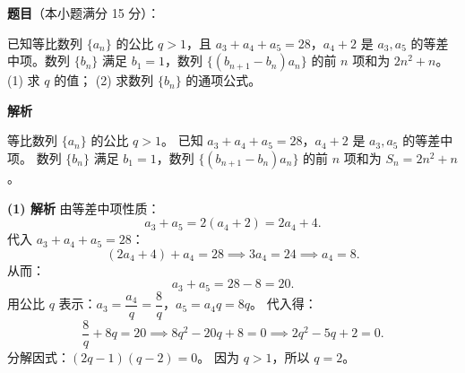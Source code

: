 \begin{answer}

\textbf{题目}（本小题满分 15 分）：

已知等比数列 $\{a_n\}$ 的公比 $q > 1$，且 $a_3 + a_4 + a_5 = 28$，$a_4 + 2$ 是 $a_3, a_5$ 的等差中项。数列 $\{b_n\}$ 满足 $b_1 = 1$，数列 $\{(b_{n+1} - b_n)a_n\}$ 的前 $n$ 项和为 $2n^2 + n$。
(1) 求 $q$ 的值；
(2) 求数列 $\{b_n\}$ 的通项公式。

\textbf{解析}

等比数列 $\{a_n\}$ 的公比 $q > 1$。
已知 $a_3 + a_4 + a_5 = 28$，$a_4 + 2$ 是 $a_3, a_5$ 的等差中项。
数列 $\{b_n\}$ 满足 $b_1 = 1$，数列 $\{(b_{n+1} - b_n)a_n\}$ 的前 $n$ 项和为 $S_n = 2n^2 + n$。

\textbf{(1) 解析} 由等差中项性质：
\nopagebreak[4]
\[a_3 + a_5 = 2(a_4 + 2) = 2a_4 + 4.\]
代入 $a_3 + a_4 + a_5 = 28$：
\nopagebreak[4]
\[(2a_4 + 4) + a_4 = 28 \implies 3a_4 = 24 \implies a_4 = 8.\]
从而：
\nopagebreak[4]
\[a_3 + a_5 = 28 - 8 = 20.\]
用公比 $q$ 表示：$a_3 = \dfrac{a_4}{q} = \dfrac{8}{q}$，$a_5 = a_4 q = 8q$。
代入得：
\nopagebreak[4]
\[\dfrac{8}{q} + 8q = 20 \implies 8q^2 - 20q + 8 = 0 \implies 2q^2 - 5q + 2 = 0.\]
分解因式：$(2q - 1)(q - 2) = 0$。
因为 $q > 1$，所以 $q = 2$。


\end{answer}

